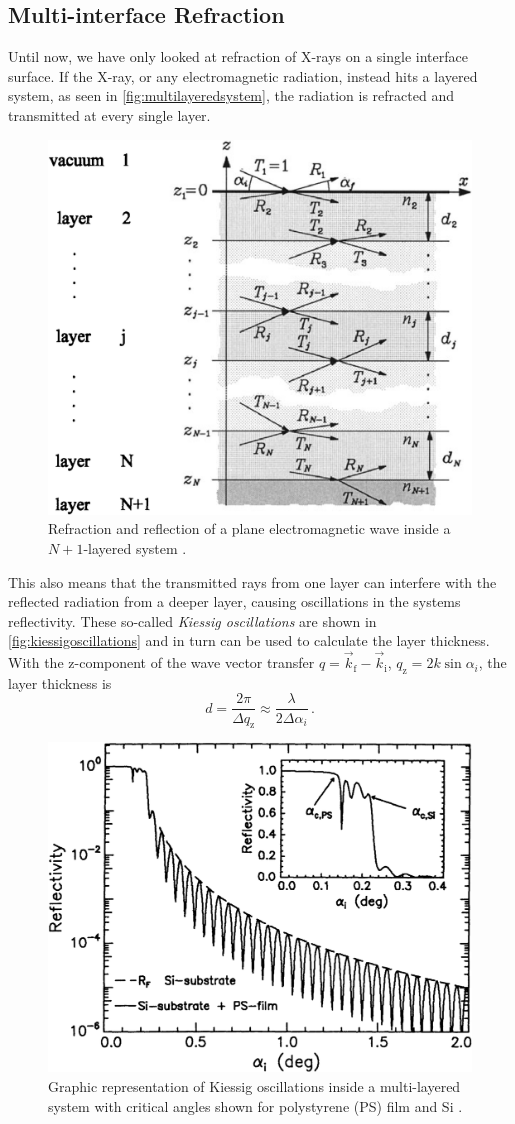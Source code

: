 \subsection{Multi-interface Refraction}

Until now, we have only looked at refraction of X-rays on a single interface surface.
If the X-ray, or any electromagnetic radiation, instead hits a layered system, as seen in \autoref{fig:multilayeredsystem}, the radiation is refracted and transmitted at every single layer.

\begin{figure}[H]
    \centering
    \includegraphics[width=.5\textwidth]{figures/multi_layer.png}
    \caption{Refraction and reflection of a plane electromagnetic wave inside a $N+1$-layered system \cite{tolan}.}
    \label{fig:multilayeredsystem}
\end{figure}
This also means that the transmitted rays from one layer can interfere with the reflected radiation from a deeper layer, 
causing oscillations in the systems reflectivity.
These so-called \textit{Kiessig oscillations} are shown in \autoref{fig:kiessigoscillations} and in turn can be used to calculate the layer thickness.
With the z-component of the wave vector transfer $q = \vec{k}_\text{f} - \vec{k}_\text{i}$, $q_\text{z} = 2 k \sin\alpha_i$, the layer thickness is
\begin{equation}
    d = \frac{2\pi}{\Delta q_\text{z}} \approx \frac{\lambda}{2 \Delta \alpha_i} \,.
    \label{eq:layerthickness}
\end{equation} 

\begin{figure}[H]
    \centering
    \includegraphics[width=.5\textwidth]{figures/kiessig_oszillation.png}
    \caption{Graphic representation of Kiessig oscillations inside a multi-layered system with critical angles shown for polystyrene (PS) film and Si \cite{tolan}.}
    \label{fig:kiessigoscillations}
\end{figure}

